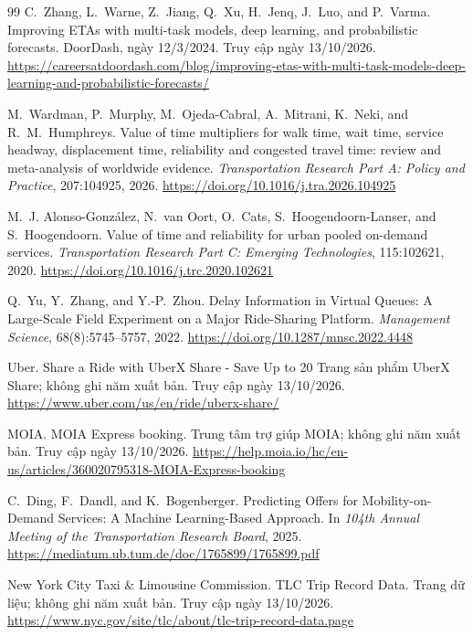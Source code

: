 \begin{thebibliography}{99}
C.~Zhang, L.~Warne, Z.~Jiang, Q.~Xu, H.~Jenq, J.~Luo, and P.~Varma.
\newblock Improving ETAs with multi-task models, deep learning, and probabilistic forecasts.
\newblock DoorDash, ngày 12/3/2024. Truy cập ngày 13/10/2026.
\newblock \url{https://careersatdoordash.com/blog/improving-etas-with-multi-task-models-deep-learning-and-probabilistic-forecasts/}

M.~Wardman, P.~Murphy, M.~Ojeda-Cabral, A.~Mitrani, K.~Neki, and R.~M.~Humphreys.
\newblock Value of time multipliers for walk time, wait time, service headway, displacement time, reliability and congested travel time: review and meta-analysis of worldwide evidence.
\newblock \emph{Transportation Research Part A: Policy and Practice}, 207:104925, 2026.
\newblock \url{https://doi.org/10.1016/j.tra.2026.104925}

M.~J. Alonso-González, N.~van Oort, O.~Cats, S.~Hoogendoorn-Lanser, and S.~Hoogendoorn.
\newblock Value of time and reliability for urban pooled on-demand services.
\newblock \emph{Transportation Research Part C: Emerging Technologies}, 115:102621, 2020.
\newblock \url{https://doi.org/10.1016/j.trc.2020.102621}

Q.~Yu, Y.~Zhang, and Y.-P.~Zhou.
\newblock Delay Information in Virtual Queues: A Large-Scale Field Experiment on a Major Ride-Sharing Platform.
\newblock \emph{Management Science}, 68(8):5745--5757, 2022.
\newblock \url{https://doi.org/10.1287/mnsc.2022.4448}

Uber.
\newblock Share a Ride with UberX Share - Save Up to 20%
\newblock Trang sản phẩm UberX Share; không ghi năm xuất bản. Truy cập ngày 13/10/2026.
\newblock \url{https://www.uber.com/us/en/ride/uberx-share/}

MOIA.
\newblock MOIA Express booking.
\newblock Trung tâm trợ giúp MOIA; không ghi năm xuất bản. Truy cập ngày 13/10/2026.
\newblock \url{https://help.moia.io/hc/en-us/articles/360020795318-MOIA-Express-booking}

C.~Ding, F.~Dandl, and K.~Bogenberger.
\newblock Predicting Offers for Mobility-on-Demand Services: A Machine Learning-Based Approach.
\newblock In \emph{104th Annual Meeting of the Transportation Research Board}, 2025.
\newblock \url{https://mediatum.ub.tum.de/doc/1765899/1765899.pdf}

New York City Taxi \& Limousine Commission.
\newblock TLC Trip Record Data.
\newblock Trang dữ liệu; không ghi năm xuất bản. Truy cập ngày 13/10/2026.
\newblock \url{https://www.nyc.gov/site/tlc/about/tlc-trip-record-data.page}


\end{thebibliography}
